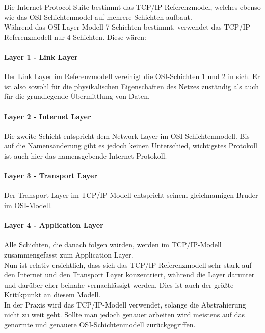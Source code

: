 \documentclass[12pt,a4paper]{report}
\begin{document}
\begin{onehalfspace}
Die Internet Protocol Suite bestimmt das TCP/IP-Referenzmodel, welches ebenso wie das OSI-Schichtenmodel auf mehrere Schichten aufbaut.\\
Während das OSI-Layer Modell 7 Schichten bestimmt, verwendet das TCP/IP-Referenzmodell nur 4 Schichten. Diese wären:\\

\paragraph{Layer 1 - Link Layer}
Der Link Layer im Referenzmodell vereinigt die OSI-Schichten 1 und 2 in sich. Er ist also sowohl für die physikalischen Eigenschaften des Netzes zuständig als auch für die grundlegende Übermittlung von Daten.

\paragraph{Layer 2 - Internet Layer}
Die zweite Schicht entspricht dem Network-Layer im OSI-Schichtenmodell. Bis auf die Namensänderung gibt es jedoch keinen Unterschied, wichtigstes Protokoll ist auch hier das namensgebende Internet Protokoll.

\paragraph{Layer 3 - Transport Layer}
Der Transport Layer im TCP/IP Modell entspricht seinem gleichnamigen Bruder im OSI-Modell. 

\paragraph{Layer 4 - Application Layer}
Alle Schichten, die danach folgen würden, werden im TCP/IP-Modell zusammengefasst zum Application Layer.\\

Nun ist relativ ersichtlich, dass sich das TCP/IP-Referenzmodell sehr stark auf den Internet und den Transport Layer konzentriert, während die Layer darunter und darüber eher beinahe vernachlässigt werden. Dies ist auch der größte Kritikpunkt an diesem Modell.\\
In der Praxis wird das TCP/IP-Modell verwendet, solange die Abstrahierung nicht zu weit geht. Sollte man jedoch genauer arbeiten wird meistens auf das genormte und genauere OSI-Schichtenmodell zurückgegriffen.\\


\end{onehalfspace}
\end{document}
